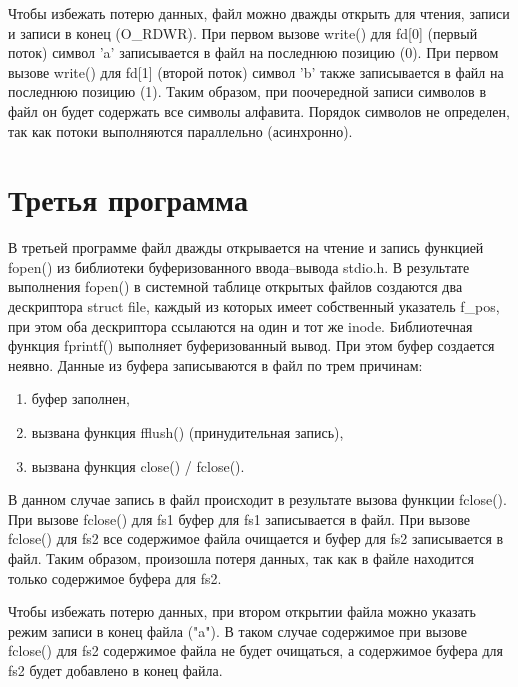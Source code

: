Чтобы избежать потерю данных, файл можно дважды открыть для чтения, записи и записи в конец (O\_RDWR).
При первом вызове write() для fd[0] (первый поток) символ 'a' записывается в файл на последнюю позицию (0).
При первом вызове write() для fd[1] (второй поток) символ 'b' также записывается в файл на последнюю позицию (1).
Таким образом, при поочередной записи символов в файл он будет содержать все символы алфавита.
Порядок символов не определен, так как потоки выполняются параллельно (асинхронно).

\clearpage

\section{Третья программа}



В третьей программе файл дважды открывается на чтение и запись функцией fopen() из библиотеки буферизованного ввода--вывода stdio.h.
В результате выполнения fopen() в системной таблице открытых файлов создаются два дескриптора struct file, каждый из которых имеет собственный указатель f\_pos, при этом оба дескриптора ссылаются на один и тот же inode.
Библиотечная функция fprintf() выполняет буферизованный вывод.
При этом буфер создается неявно.
Данные из буфера записываются в файл по трем причинам:

\begin{enumerate}
	\item буфер заполнен,
	\item вызвана функция fflush() (принудительная запись),
	\item вызвана функция close() / fclose().
\end{enumerate}

В данном случае запись в файл происходит в результате вызова функции fclose().
При вызове fclose() для fs1 буфер для fs1 записывается в файл.
При вызове fclose() для fs2 все содержимое файла очищается и буфер для fs2 записывается в файл.
Таким образом, произошла потеря данных, так как в файле находится только содержимое буфера для fs2.

Чтобы избежать потерю данных, при втором открытии файла можно указать режим записи в конец файла ("a").
В таком случае содержимое при вызове fclose() для fs2 содержимое файла не будет очищаться, а содержимое буфера для fs2 будет добавлено в конец файла.

